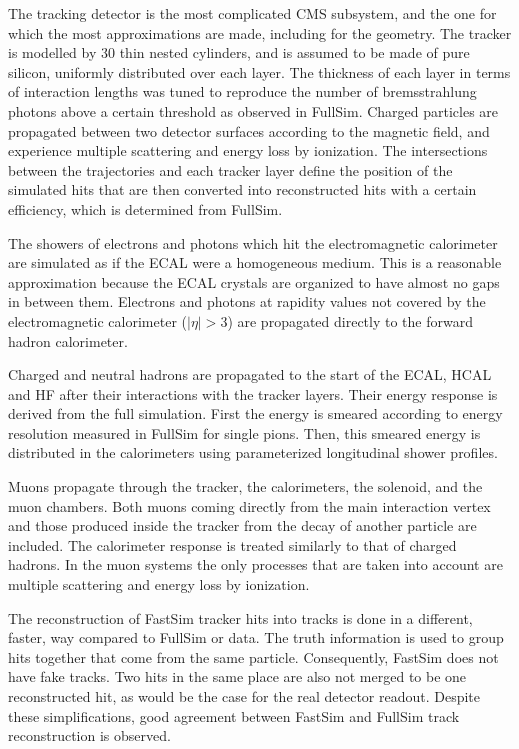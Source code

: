 The tracking detector is the most complicated CMS subsystem, and the one for which the most
approximations are made, including for the geometry.
The tracker is modelled by 30 thin nested cylinders, and is assumed to be made of pure silicon,
uniformly distributed over each layer. The thickness of each layer in terms of interaction lengths
was tuned to reproduce the number of bremsstrahlung photons above a certain threshold as observed in
FullSim.
Charged particles are propagated between two detector surfaces according to the magnetic field, and
experience multiple scattering and energy loss by ionization. The intersections between the
trajectories and each tracker layer define the position of the simulated hits that are then
converted into reconstructed hits with a certain efficiency, which is determined from FullSim. 

The showers of electrons and photons which hit the electromagnetic calori\-meter are simulated as if
the ECAL were a homogeneous medium. This is a reasonable approximation because the ECAL crystals
are organized to have almost no gaps in between them. 
Electrons and photons at rapidity values not covered by the electromagnetic calorimeter ($|\eta| >
3$) are propagated directly to the forward hadron calorimeter.

Charged and neutral hadrons are propagated to the start of the ECAL, HCAL and HF after their
interactions with the tracker layers. Their energy response is derived from the full
simulation. First the energy is smeared according to energy resolution measured in FullSim for
single pions. Then, this smeared energy is distributed in the calorimeters using parameterized
longitudinal shower profiles. 

Muons propagate through the tracker, the calorimeters, the solenoid, and the muon chambers. 
Both muons coming directly from the main interaction vertex and those produced inside the
tracker from the decay of another particle are included. 
The calorimeter response is treated similarly to that of charged hadrons. In the muon systems the
only processes that are taken into account are multiple scattering and energy loss by ionization.

The reconstruction of FastSim tracker hits into tracks is done in a different, faster, way compared
to FullSim or data. The truth information is used to group hits together that come from the same
particle. Consequently, FastSim does not have fake tracks. Two hits in the same place are also not
merged to be one reconstructed hit, as would be the case for the real detector readout. 
Despite these simplifications, good agreement between FastSim and FullSim track reconstruction is
observed. 


